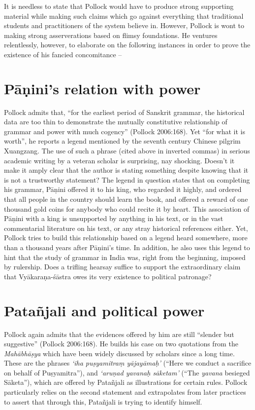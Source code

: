 It is needless to state that Pollock would have to produce strong supporting material while making such claims which go against everything that traditional students and practitioners of the system believe in. However, Pollock is wont to making strong asserverations based on flimsy foundations. He ventures relentlessly, however, to elaborate on the following instances in order to prove the existence of his fancied concomitance --

\section{Pāṇini’s relation with power}\label{chap3-sec8}

Pollock admits that, ``for the earliest period of Sanskrit grammar, the historical data are too thin to demonstrate the mutually constitutive relationship of grammar and power with much cogency'' (Pollock 2006:168). Yet ``for what it is worth'', he reports a legend mentioned by the seventh century Chinese pilgrim Xuangzang. The use of such a phrase (cited above in inverted commas) in serious academic writing by a veteran scholar is surprising, nay shocking. Doesn't it make it amply clear that the author is stating something despite knowing that it is not a trustworthy statement? The legend in question states that on completing his grammar, Pāṇini offered it to his king, who regarded it highly, and ordered that all people in the country should learn the book, and offered a reward of one thousand gold coins for anybody who could recite it by heart. This association of Pāṇini with a king is unsupported by anything in his text, or in the vast commentarial literature on his text, or any stray historical references either. Yet, Pollock tries to build this relationship based on a legend heard somewhere, more than a thousand years after Pāṇini's time. In addition, he also uses this legend to hint that the study of grammar in India was, right from the beginning, imposed by rulership. Does a trifling hearsay suffice to support the extraordinary claim that Vyākaraṇa-śāstra owes its very existence to political patronage?

\section{Patañjali and political power}\label{chap3-sec9}

Pollock again admits that the evidences offered by him are still ``slender but suggestive'' (Pollock 2006:168). He builds his case on two quotations from the {\sl Mahābhāṣya} which have been widely discussed by scholars since a long time. These are the phrases {\sl `iha puṣyamitraṃ yājayāmaḥ'} (``Here we conduct a sacrifice on behalf of Puṣyamitra''), and {\sl `aruṇad yavanaḥ sāketam'} (``The {\sl yavana} besieged Sāketa''), which are offered by Patañjali as illustrations for certain rules. Pollock particularly relies on the second statement and extrapolates from later practices to assert that through this, Patañjali is trying to identify himself.

